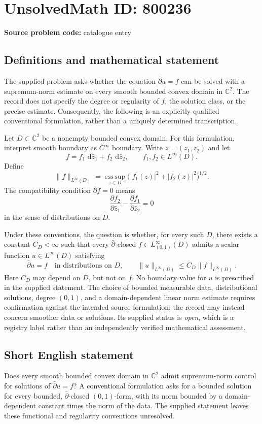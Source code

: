 \documentclass[11pt]{article}
\newcommand{\C}{\mathbb{C}}
\newcommand{\dd}{\,\mathrm{d}}
\begin{document}
\section*{UnsolvedMath ID: 800236}
\textbf{Source problem code:} catalogue entry
\subsection{Definitions and mathematical statement}
The supplied problem asks whether the equation \(\bar\partial u=f\) can be solved with a supremum-norm estimate on every smooth bounded convex domain in \(\C^2\). The record does not specify the degree or regularity of \(f\), the solution class, or the precise estimate. Consequently, the following is an explicitly qualified conventional formulation, rather than a uniquely determined transcription.

Let \(D\subset\C^2\) be a nonempty bounded convex domain. For this formulation, interpret smooth boundary as \(C^\infty\) boundary. Write \(z=(z_1,z_2)\) and let
\[
f=f_1\,\dd\bar z_1+f_2\,\dd\bar z_2,
\qquad f_1,f_2\in L^\infty(D).
\]
Define
\[
\|f\|_{L^\infty(D)}
=\operatorname*{ess\,sup}_{z\in D}
\bigl(|f_1(z)|^2+|f_2(z)|^2\bigr)^{1/2}.
\]
The compatibility condition \(\bar\partial f=0\) means
\[
\frac{\partial f_2}{\partial\bar z_1}
-\frac{\partial f_1}{\partial\bar z_2}=0
\]
in the sense of distributions on \(D\).

Under these conventions, the question is whether, for every such \(D\), there exists a constant \(C_D<\infty\) such that every \(\bar\partial\)-closed \(f\in L^\infty_{(0,1)}(D)\) admits a scalar function \(u\in L^\infty(D)\) satisfying
\[
\bar\partial u=f\quad\text{in distributions on }D,
\qquad
\|u\|_{L^\infty(D)}\le C_D\|f\|_{L^\infty(D)}.
\]
Here \(C_D\) may depend on \(D\), but not on \(f\). No boundary value for \(u\) is prescribed in the supplied statement. The choice of bounded measurable data, distributional solutions, degree \((0,1)\), and a domain-dependent linear norm estimate requires confirmation against the intended source formulation; the record may instead concern smoother data or solutions. Its supplied status is \emph{open}, which is a registry label rather than an independently verified mathematical assessment.
\subsection{Short English statement}
Does every smooth bounded convex domain in \(\C^2\) admit supremum-norm control for solutions of \(\bar\partial u=f\)? A conventional formulation asks for a bounded solution for every bounded, \(\bar\partial\)-closed \((0,1)\)-form, with its norm bounded by a domain-dependent constant times the norm of the data. The supplied statement leaves these functional and regularity conventions unresolved.
\end{document}
